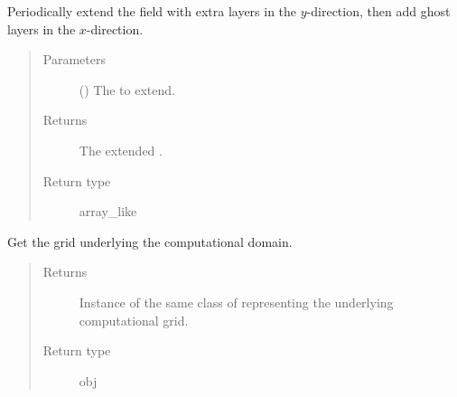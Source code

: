\documentclass[letterpaper,10pt,english]{sphinxmanual}
\begin{document}
\begin{fulllineitems}

\begin{fulllineitems}
\label{\detokenize{api:dycore.horizontal_boundary_periodic.PeriodicYZ.from_physical_to_computational_domain}}
Periodically extend the field  with  extra layers in the \(y\)-direction,
then add  ghost layers in the \(x\)-direction.
\begin{quote}\begin{description}
\item[{Parameters}] \leavevmode
{} () \textendash{} The  to extend.

\item[{Returns}] \leavevmode
The extended .

\item[{Return type}] \leavevmode
array\_like

\end{description}\end{quote}

\end{fulllineitems}


\begin{fulllineitems}
\label{\detokenize{api:dycore.horizontal_boundary_periodic.PeriodicYZ.get_computational_grid}}
Get the  grid underlying the computational domain.
\begin{quote}\begin{description}
\item[{Returns}] \leavevmode
Instance of the same class of 
representing the underlying computational grid.

\item[{Return type}] \leavevmode
obj


\end{description}
\end{quote}
\end{fulllineitems}
\end{fulllineitems}
\end{document}
